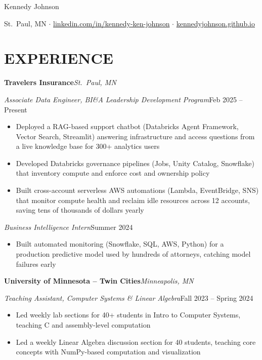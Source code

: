 \documentclass[paper=letter,fontsize=10.5pt]{scrartcl}
\newcommand{\MyName}[1]{\begin{center}\Huge\usefont{OT1}{ppl}{b}{n}#1\end{center}}
\newcommand{\NewPart}[1]{\section*{\uppercase{#1}}}
\newcommand{\Org}[2]{\textbf{#1}\hfill\textit{#2}\par}
\newcommand{\Role}[2]{\textit{#1}\hfill #2\par}
\begin{document}
\MyName{Kennedy Johnson}
\vspace{-4pt}
\begin{center}\small St.\ Paul, MN \enspace$\cdot$\enspace
\href{https://www.linkedin.com/in/kennedy-ken-johnson/}{linkedin.com/in/kennedy-ken-johnson} \enspace$\cdot$\enspace
\href{https://kennedyjohnson.github.io/}{kennedyjohnson.github.io}\end{center}
\vspace{-6pt}

\NewPart{Experience}

\Org{Travelers Insurance}{St.\ Paul, MN}
\Role{Associate Data Engineer, BI\&A Leadership Development Program}{Feb 2025 -- Present}
\begin{itemize}
  \item Deployed a RAG-based support chatbot (Databricks Agent Framework, Vector Search, Streamlit) answering infrastructure and access questions from a live knowledge base for 300+ analytics users
  \item Developed Databricks governance pipelines (Jobs, Unity Catalog, Snowflake) that inventory compute and enforce cost and ownership policy
  \item Built cross-account serverless AWS automations (Lambda, EventBridge, SNS) that monitor compute health and reclaim idle resources across 12 accounts, saving tens of thousands of dollars yearly
\end{itemize}
\vspace{3pt}
\Role{Business Intelligence Intern}{Summer 2024}
\begin{itemize}
  \item Built automated monitoring (Snowflake, SQL, AWS, Python) for a production predictive model used by hundreds of attorneys, catching model failures early
\end{itemize}

\vspace{5pt}
\Org{University of Minnesota -- Twin Cities}{Minneapolis, MN}
\Role{Teaching Assistant, Computer Systems \& Linear Algebra}{Fall 2023 -- Spring 2024}
\begin{itemize}
  \item Led weekly lab sections for 40+ students in Intro to Computer Systems, teaching C and assembly-level computation
  \item Led a weekly Linear Algebra discussion section for 40 students, teaching core concepts with NumPy-based computation and visualization
\end{itemize}
\end{document}
